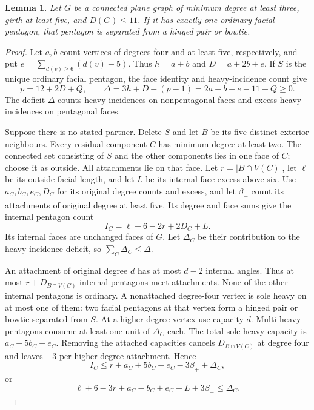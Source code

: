 \documentclass[11pt]{article}
\newtheorem{lemma}[theorem]{Lemma}
\theoremstyle{remark}
\numberwithin{equation}{section}
\numberwithin{table}{section}
\begin{document}
\begin{lemma}\label{lem:unique-ordinary-partner}
Let $G$ be a connected plane graph of minimum degree at least three,
girth at least five, and $D(G)\le11$. If it has exactly one ordinary
facial pentagon, that pentagon is separated from a hinged pair or bowtie.
\end{lemma}
\begin{proof}
Let $a,b$ count vertices of degrees four and at least five, respectively,
and put $e=\sum_{d(v)\ge6}(d(v)-5)$. Thus $h=a+b$ and
$D=a+2b+e$. If $S$ is the unique ordinary facial pentagon, the face
identity and heavy-incidence count give
\[
 p=12+2D+Q,\qquad
 \Delta=3h+D-(p-1)=2a+b-e-11-Q\ge0.
\]
The deficit $\Delta$ counts heavy incidences on nonpentagonal faces
and excess heavy incidences on pentagonal faces.

Suppose there is no stated partner. Delete $S$ and let $B$ be its
five distinct exterior neighbours. Every residual component $C$ has
minimum degree at least two. The connected set consisting of $S$ and
the other components lies in one face of $C$; choose it as outside.
All attachments lie on that face. Let $r=|B\cap V(C)|$, let $\ell$
be its outside facial length, and let $L$ be its internal face excess
above six. Use $a_C,b_C,e_C,D_C$ for its original degree counts and
excess, and let $\beta_+$ count its attachments of original degree at
least five. Its degree and face sums give the internal pentagon count
\[
 I_C=\ell+6-2r+2D_C+L.
\]
Its internal faces are unchanged faces of $G$. Let $\Delta_C$ be
their contribution to the heavy-incidence deficit, so
$\sum_C\Delta_C\le\Delta$.

An attachment of original degree $d$ has at most $d-2$ internal
angles. Thus at most $r+D_{B\cap V(C)}$ internal pentagons meet
attachments. None of the other internal pentagons is ordinary. A
nonattached degree-four vertex is sole heavy on at most one of them:
two facial pentagons at that vertex form a hinged pair or bowtie
separated from $S$. At a higher-degree vertex use capacity $d$.
Multi-heavy pentagons consume at least one unit of $\Delta_C$ each.
The total sole-heavy capacity is $a_C+5b_C+e_C$. Removing the attached
capacities cancels $D_{B\cap V(C)}$ at degree four and leaves $-3$
per higher-degree attachment. Hence
\[
 I_C\le r+a_C+5b_C+e_C-3\beta_++\Delta_C,
\]
or
\begin{equation}\label{eq:unique-ordinary-component}
 \ell+6-3r+a_C-b_C+e_C+L+3\beta_+\le\Delta_C.
\end{equation}


\end{proof}
\end{document}
